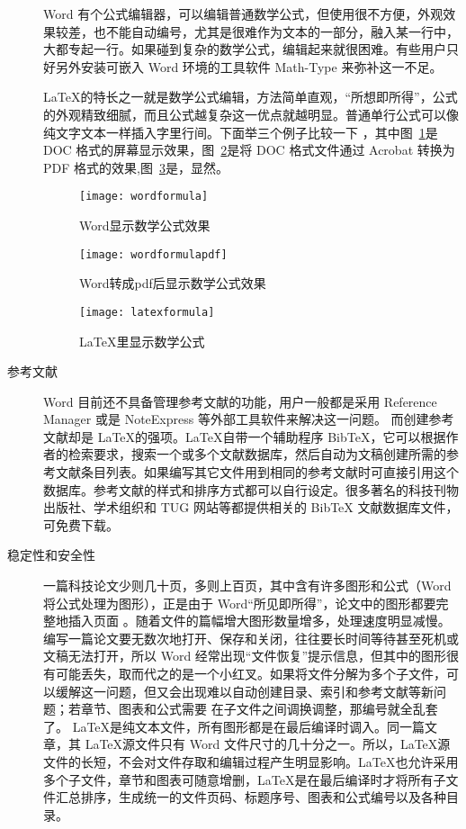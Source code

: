\begin{description}
Word 有个公式编辑器，可以编辑普通数学公式，但使用很不方便，外观效果较差，也不能自动编号，尤其是很难作为文本的一部分，融入某一行中，大都专起一行。如果碰到复杂的数学公式，编辑起来就很困难。有些用户只好另外安装可嵌入 Word 环境的工具软件 Math-Type 来弥补这一不足。

\LaTeX 的特长之一就是数学公式编辑，方法简单直观，“所想即所得”，公式的外观精致细腻，而且公式越复杂这一优点就越明显。普通单行公式可以像纯文字文本一样插入字里行间。下面举三个例子比较一下 ，其中图~\ref{fig:xfig3}是 DOC 格式的屏幕显示效果，图~\ref{fig:xfig4}是将 DOC 格式文件通过 Acrobat 转换为 PDF 格式的效果,图~\ref{fig:xfig5}是，显然。
\begin{figure}[H]
  \centering
  \texttt{[image: wordformula]}
  \caption{Word显示数学公式效果}
  \label{fig:xfig3}
\end{figure}
\begin{figure}[H]
  \centering
  \texttt{[image: wordformulapdf]}
  \caption{Word转成pdf后显示数学公式效果}
  \label{fig:xfig4}
\end{figure}
\begin{figure}[H]
  \centering
  \texttt{[image: latexformula]}
  \caption{LaTeX里显示数学公式}
  \label{fig:xfig5}
\end{figure}
\item[参考文献] Word 目前还不具备管理参考文献的功能，用户一般都是采用 Reference Manager 或是 NoteExpress 等外部工具软件来解决这一问题。
而创建参考文献却是 \LaTeX 的强项。\LaTeX 自带一个辅助程序 BibTeX，它可以根据作者的检索要求，搜索一个或多个文献数据库，然后自动为文稿创建所需的参考文献条目列表。如果编写其它文件用到相同的参考文献时可直接引用这个数据库。参考文献的样式和排序方式都可以自行设定。很多著名的科技刊物出版社、学术组织和 TUG 网站等都提供相关的 BibTeX 文献数据库文件，可免费下载。
\item[稳定性和安全性] 一篇科技论文少则几十页，多则上百页，其中含有许多图形和公式（Word 将公式处理为图形），正是由于 Word“所见即所得”，论文中的图形都要完整地插入页面 。随着文件的篇幅增大图形数量增多，处理速度明显减慢。编写一篇论文要无数次地打开、保存和关闭，往往要长时间等待甚至死机或文稿无法打开，所以 Word 经常出现“文件恢复”提示信息，但其中的图形很有可能丢失，取而代之的是一个小红叉。如果将文件分解为多个子文件，可以缓解这一问题，但又会出现难以自动创建目录、索引和参考文献等新问题；若章节、图表和公式需要 在子文件之间调换调整，那编号就全乱套了。
\LaTeX 是纯文本文件，所有图形都是在最后编译时调入。同一篇文章，其 \LaTeX 源文件只有 Word 文件尺寸的几十分之一。所以，\LaTeX 源文件的长短，不会对文件存取和编辑过程产生明显影响。\LaTeX 也允许采用多个子文件，章节和图表可随意增删，\LaTeX 是在最后编译时才将所有子文件汇总排序，生成统一的文件页码、标题序号、图表和公式编号以及各种目录。

\end{description}
